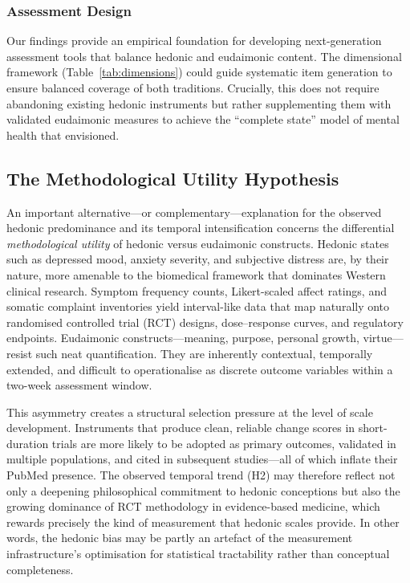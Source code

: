 \documentclass[12pt,a4paper]{article}
\begin{document}
\subsubsection{Assessment Design}

Our findings provide an empirical foundation for developing next-generation assessment tools that balance hedonic and eudaimonic content.
The dimensional framework (Table~\ref{tab:dimensions}) could guide systematic item generation to ensure balanced coverage of both traditions.
Crucially, this does not require abandoning existing hedonic instruments but rather supplementing them with validated eudaimonic measures to achieve the ``complete state'' model of mental health that \citet{keyes2002mental} envisioned.

\subsection{The Methodological Utility Hypothesis}

An important alternative---or complementary---explanation for the observed hedonic predominance and its temporal intensification concerns the differential \textit{methodological utility} of hedonic versus eudaimonic constructs.
Hedonic states such as depressed mood, anxiety severity, and subjective distress are, by their nature, more amenable to the biomedical framework that dominates Western clinical research.
Symptom frequency counts, Likert-scaled affect ratings, and somatic complaint inventories yield interval-like data that map naturally onto randomised controlled trial (RCT) designs, dose--response curves, and regulatory endpoints.
Eudaimonic constructs---meaning, purpose, personal growth, virtue---resist such neat quantification.
They are inherently contextual, temporally extended, and difficult to operationalise as discrete outcome variables within a two-week assessment window.

This asymmetry creates a structural selection pressure at the level of scale development.
Instruments that produce clean, reliable change scores in short-duration trials are more likely to be adopted as primary outcomes, validated in multiple populations, and cited in subsequent studies---all of which inflate their PubMed presence.
The observed temporal trend (H2) may therefore reflect not only a deepening philosophical commitment to hedonic conceptions but also the growing dominance of RCT methodology in evidence-based medicine, which rewards precisely the kind of measurement that hedonic scales provide.
In other words, the hedonic bias may be partly an artefact of the measurement infrastructure's optimisation for statistical tractability rather than conceptual completeness.
\end{document}
